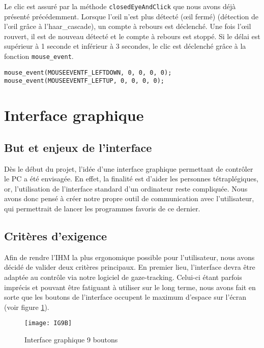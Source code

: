 Le clic est assuré par la méthode \lstinline=closedEyeAndClick= que nous avons déjà présenté précédemment. Lorsque l’œil n’est plus détecté (œil fermé) (détection de l’œil grâce à l’haar\_cascade), un compte à rebours est déclenché. Une fois l’œil rouvert, il est de nouveau détecté et le compte à rebours est stoppé. Si le délai est supérieur à 1 seconde et inférieur à 3 secondes, le clic est déclenché grâce à la fonction \lstinline=mouse_event=.

\begin{lstlisting}
mouse_event(MOUSEEVENTF_LEFTDOWN, 0, 0, 0, 0);
mouse_event(MOUSEEVENTF_LEFTUP, 0, 0, 0, 0);
\end{lstlisting}

\section{Interface graphique}

\subsection{But et enjeux de l’interface}

Dès le début du projet, l’idée d’une interface graphique permettant de contrôler le PC a été envisagée. En effet, la finalité est d’aider les personnes tétraplégiques, or, l’utilisation de l’interface standard d’un ordinateur reste compliquée. Nous avons donc pensé à créer notre propre outil de communication avec l'utilisateur, qui permettrait de lancer les programmes favoris de ce dernier.

\subsection{Critères d’exigence}

Afin de rendre l’IHM la plus ergonomique possible pour l’utilisateur, nous avons décidé de valider deux critères principaux. En premier lieu, l’interface devra être adaptée au contrôle via notre logiciel de gaze-tracking. Celui-ci étant parfois imprécis et pouvant être fatiguant à utiliser sur le long terme, nous avons fait en sorte que les boutons de l’interface occupent le maximum d’espace sur l’écran (voir figure \ref{fig:IG9B}).

\begin{figure}[H]
  \centering
  \texttt{[image: IG9B]}
  \caption{Interface graphique 9 boutons}
  \label{fig:IG9B}
\end{figure}

